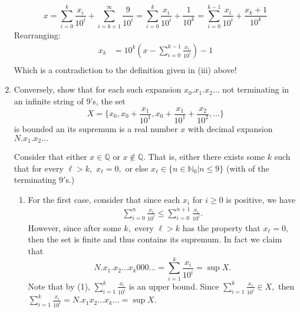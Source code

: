 \documentclass[11pt]{article}
\newcommand{\bbN}{\mathbb{N}}
\newcommand{\bbQ}{\mathbb{Q}}
\begin{document}
\begin{enumerate}
\begin{solution}
    \[x = \sum_{i = 0}^k \frac{x_i}{10^i} + \sum_{i=k+1}^\infty \frac{9}{10^i} = \sum_{i = 0}^k \frac{x_i}{10^i} + \frac{1}{10^k} = \sum_{i=0}^{k-1}\frac{x_i}{10^i} + \frac{x_k +1}{10^k}\] Rearranging:
    \begin{align*}
      x_k &= 10^{k}\left(x - \sum_{i=0}^{k-1}\frac{x_i}{10^i}\right) -1 \\
    \end{align*}
    Which is a contradiction to the definition given in (iii) above!
    \end{solution}

\item 
    \begin{problem}
    Conversely, show that for each such expansion $x_0.x_1.x_2\dots$ not terminating in an infinite string of $9$'s, the set
    \[X = \{x_0, x_0 + \frac{x_1}{10^1}, x_0 + \frac{x_1}{10^1} + \frac{x_2}{10^2}, \dots\}\] is bounded an its supremum is a real number $x$ with decimal expansion $N.x_1.x_2\dots$
\end{problem}
\begin{solution}
Consider that either $x\in \bbQ$ or $x\notin \bbQ.$ That is, either there exists some $k$ such that for every $\ell>k,$ $x_\ell = 0,$ or else $x_\ell \in \{n\in \bbN_0 | n\leq 9\}$ (with of the terminating $9'$s.)
\begin{enumerate}
    \item For the first case, consider that since each $x_i$ for $i\geq 0$ is positive, we have \begin{align} 
    \sum_{i=0}^n\frac{x_i}{10^i}\leq \sum_{i=0}^{n+1}\frac{x_i}{10^i}.\end{align} However, since after some $k,$ every $\ell>k$ has the property that $x_\ell = 0,$ then the set is finite and thus contains its supremum. In fact we claim that
    \[N.x_1.x_2\dots x_k000\dots = \sum_{i=1}^k \frac{x_i}{10^i} = \sup X.\] Note that by (1), $\sum_{i=1}^k \frac{x_i}{10^i}$ is an upper bound. Since $\sum_{i=1}^k \frac{x_i}{10^i} \in X,$ then $\sum_{i=1}^k \frac{x_i}{10^i} = N.x_1x_2\dots x_k\dots = \sup X.$ 
    

\end{enumerate}
\end{solution}
\end{enumerate}
\end{document}
